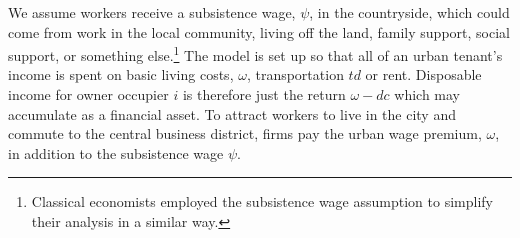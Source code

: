 
We assume workers receive a \gls{subsistence wage}, $\psi$, in the countryside, which could come from work in the local community, living off the land, family support, social support, or something else.\footnote{Classical economists employed the \gls{subsistence wage} assumption to simplify their analysis in a similar way.}
 The model is set up so that all of an urban  tenant's  income is spent on  basic living costs, $\omega$, transportation $td$ or rent. Disposable income for owner occupier $i$ is therefore just the return  $\omega -dc$ which may accumulate as a financial asset.
To attract workers to live in the city and commute to the central business district, firms pay the  \gls{urban wage premium}, $\omega$, in addition to  the subsistence wage $\psi$. 





 


